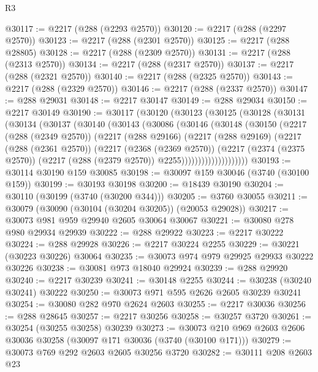 \begin{lexlean}{R3}
\begin{coremodule}
@30117 := @2217 (@288 (@2293 @2570))
@30120 := @2217 (@288 (@2297 @2570))
@30123 := @2217 (@288 (@2301 @2570))
@30125 := @2217 (@288 @28805)
@30128 := @2217 (@288 (@2309 @2570))
@30131 := @2217 (@288 (@2313 @2570))
@30134 := @2217 (@288 (@2317 @2570))
@30137 := @2217 (@288 (@2321 @2570))
@30140 := @2217 (@288 (@2325 @2570))
@30143 := @2217 (@288 (@2329 @2570))
@30146 := @2217 (@288 (@2337 @2570))
@30147 := @288 @29031
@30148 := @2217 @30147
@30149 := @288 @29034
@30150 := @2217 @30149
@30190 := @30117
    (@30120
      (@30123
        (@30125
          (@30128
            (@30131
              (@30134
                (@30137
                  (@30140
                    (@30143
                      (@30086
                        (@30146
                          (@30148
                            (@30150
                              (@2217
                                (@288 (@2349 @2570))
                                (@2217
                                  (@288 @29166)
                                  (@2217
                                    (@288 @29169)
                                    (@2217
                                      (@288 (@2361 @2570))
                                      (@2217
                                        (@2368 (@2369 @2570))
                                        (@2217
                                          (@2374 (@2375 @2570))
                                          (@2217 (@288 (@2379 @2570)) @2255))))))))))))))))))))
@30193 := @30114 @30190 @159 @30085
@30198 := @30097 @159 @30046 (@3740 (@30100 @159))
@30199 := @30193 @30198
@30200 := @18439 @30190
@30204 := @30110 (@30199 (@3740 (@30200 @344)))
@30205 := @3760 @30055
@30211 := @30079 (@30090 (@30104 (@30204 @30205)) (@20053 @29028))
@30217 := @30073 @981 @959 @29940 @2605 @30064 @30067
@30221 := @30080 @278 @980 @29934 @29939
@30222 := @288 @29922
@30223 := @2217 @30222
@30224 := @288 @29928
@30226 := @2217 @30224 @2255
@30229 := @30221 (@30223 @30226) @30064
@30235 := @30073 @974 @979 @29925 @29933 @30222 @30226
@30238 := @30081 @973 @18040 @29924
@30239 := @288 @29920
@30240 := @2217 @30239
@30241 := @30148 @2255
@30244 := @30238 (@30240 @30241) @30222
@30250 := @30073 @971 @595 @2626 @2605 @30239 @30241
@30254 := @30080 @282 @970 @2624 @2603
@30255 := @2217 @30036
@30256 := @288 @28645
@30257 := @2217 @30256
@30258 := @30257 @3720
@30261 := @30254 (@30255 @30258) @30239
@30273 := @30073 @210 @969 @2603 @2606 @30036 @30258 (@30097 @171 @30036 (@3740 (@30100 @171)))
@30279 := @30073 @769 @292 @2603 @2605 @30256 @3720
@30282 := @30111 @208 @2603 @23

\end{coremodule}
\end{lexlean}
